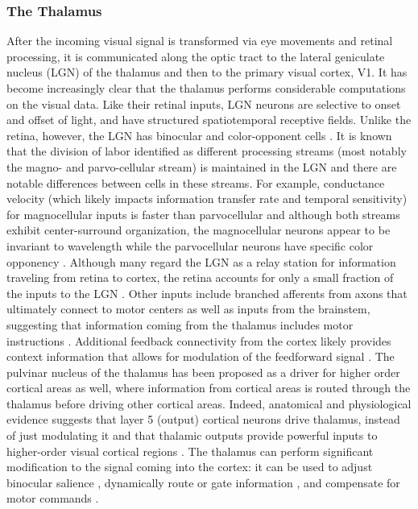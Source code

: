 \subsubsection{The Thalamus}
After the incoming visual signal is transformed via eye movements and retinal processing, it is communicated along the optic tract to the lateral geniculate nucleus (LGN) of the thalamus and then to the primary visual cortex, V1. It has become increasingly clear that the thalamus performs considerable computations on the visual data. Like their retinal inputs, LGN neurons are selective to onset and offset of light, and have structured spatiotemporal receptive fields. Unlike the retina, however, the LGN has binocular and color-opponent cells \cite{schiller1978functional, schmielau1977role}. It is known that the division of labor identified as different processing streams (most notably the magno- and parvo-cellular stream) is maintained in the LGN and there are notable differences between cells in these streams. For example, conductance velocity (which likely impacts information transfer rate and temporal sensitivity) for magnocellular inputs is faster than parvocellular and although both streams exhibit center-surround organization, the magnocellular neurons appear to be invariant to wavelength while the parvocellular neurons have specific color opponency \cite{shiller1978thalamic}. Although many regard the LGN as a relay station for information traveling from retina to cortex, the retina accounts for only a small fraction of the inputs to the LGN \cite{weyand2016multifunctional}. Other inputs include branched afferents from axons that ultimately connect to motor centers as well as inputs from the brainstem, suggesting that information coming from the thalamus includes motor instructions \cite{guillery2002thalamic}. Additional feedback connectivity from the cortex likely provides context information that allows for modulation of the feedforward signal \cite{weyand2016multifunctional, ghodrati2017towards}. The pulvinar nucleus of the thalamus has been proposed as a driver for higher order cortical areas as well, where information from cortical areas is routed through the thalamus before driving other cortical areas. Indeed, anatomical and physiological evidence suggests that layer 5 (output) cortical neurons drive thalamus, instead of just modulating it and that thalamic outputs provide powerful inputs to higher-order visual cortical regions \cite{guillery2002thalamic}. The thalamus can perform significant modification to the signal coming into the cortex: it can be used to adjust binocular salience \cite{schmielau1977role}, dynamically route or gate information \cite{olshausen1993neurobiological, weyand2016multifunctional}, and compensate for motor commands \cite{guillery2011branched}.


